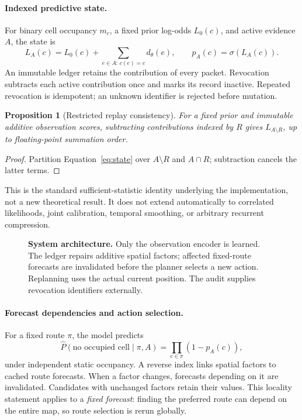 \documentclass{article}
\newtheorem{proposition}{Proposition}
\begin{document}
\paragraph{Indexed predictive state.}
For binary cell occupancy $m_c$, a fixed prior log-odds $L_0(c)$, and active evidence $A$, the state is
\begin{equation}
L_A(c)=L_0(c)+\sum_{e\in A:\,c(e)=c}d_\theta(e),
\qquad p_A(c)=\sigma(L_A(c)).
\label{eq:state}
\end{equation}
An immutable ledger retains the contribution of every packet. Revocation subtracts each active contribution once and marks its record inactive. Repeated revocation is idempotent; an unknown identifier is rejected before mutation.

\begin{proposition}[Restricted replay consistency]
For a fixed prior and immutable additive observation scores, subtracting contributions indexed by $R$ gives $L_{A\setminus R}$, up to floating-point summation order.
\end{proposition}
\begin{proof}
Partition Equation~\ref{eq:state} over $A\setminus R$ and $A\cap R$; subtraction cancels the latter terms.
\end{proof}
This is the standard sufficient-statistic identity underlying the implementation, not a new theoretical result. It does not extend automatically to correlated likelihoods, joint calibration, temporal smoothing, or arbitrary recurrent compression.

\begin{figure}[t]
\centering
\resizebox{\linewidth}{!}{}
\caption{\textbf{System architecture.} Only the observation encoder is learned. The ledger repairs additive spatial factors; affected fixed-route forecasts are invalidated before the planner selects a new action. Replanning uses the actual current position. The audit supplies revocation identifiers externally.}
\label{fig:architecture}
\end{figure}

\paragraph{Forecast dependencies and action selection.}
For a fixed route $\pi$, the model predicts
\begin{equation}
\widehat{P}(\text{no occupied cell}\mid\pi,A)=\prod_{c\in\pi}(1-p_A(c)),
\label{eq:forecast}
\end{equation}
under independent static occupancy. A reverse index links spatial factors to cached route forecasts. When a factor changes, forecasts depending on it are invalidated. Candidates with unchanged factors retain their values. This locality statement applies to a \emph{fixed forecast}: finding the preferred route can depend on the entire map, so route selection is rerun globally.
\end{document}
